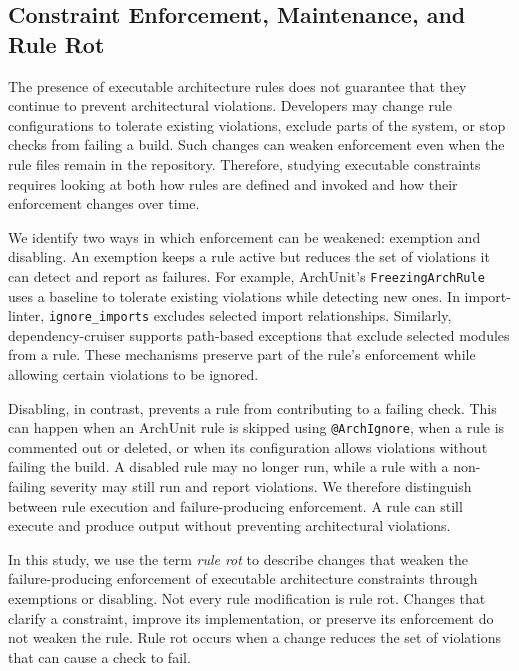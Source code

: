 \subsection{Constraint Enforcement, Maintenance, and Rule Rot}

The presence of executable architecture rules does not guarantee that they continue to prevent architectural violations. Developers may change rule configurations to tolerate existing violations, exclude parts of the system, or stop checks from failing a build. Such changes can weaken enforcement even when the rule files remain in the repository. Therefore, studying executable constraints requires looking at both how rules are defined and invoked and how their enforcement changes over time.

We identify two ways in which enforcement can be weakened: exemption and disabling. An exemption keeps a rule active but reduces the set of violations it can detect and report as failures. For example, ArchUnit's \texttt{FreezingArchRule} uses a baseline to tolerate existing violations while detecting new ones. In import-linter, \texttt{ignore\_imports} excludes selected import relationships. Similarly, dependency-cruiser supports path-based exceptions that exclude selected modules from a rule. These mechanisms preserve part of the rule's enforcement while allowing certain violations to be ignored.

Disabling, in contrast, prevents a rule from contributing to a failing check. This can happen when an ArchUnit rule is skipped using \texttt{@ArchIgnore}, when a rule is commented out or deleted, or when its configuration allows violations without failing the build. A disabled rule may no longer run, while a rule with a non-failing severity may still run and report violations. We therefore distinguish between rule execution and failure-producing enforcement. A rule can still execute and produce output without preventing architectural violations.

In this study, we use the term \emph{rule rot} to describe changes that weaken the failure-producing enforcement of executable architecture constraints through exemptions or disabling. Not every rule modification is rule rot. Changes that clarify a constraint, improve its implementation, or preserve its enforcement do not weaken the rule. Rule rot occurs when a change reduces the set of violations that can cause a check to fail.


